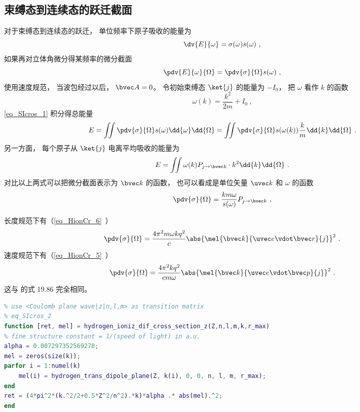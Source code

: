 \subsection{束缚态到连续态的跃迁截面}
对于束缚态到连续态的跃迁， 单位频率下原子吸收的能量为
\begin{equation}
\dv{E}{\omega} = \sigma(\omega) s(\omega)~,
\end{equation}
如果再对立体角微分得某频率的微分截面 %
\begin{equation}\label{eq_SIcros_1}
\pdv{E}{\omega}{\Omega} = \pdv{\sigma}{\Omega} s(\omega)~,
\end{equation}
使用速度规范， 当波包经过以后， $\bvec A = 0$。 令初始束缚态 $\ket{j}$ 的能量为 $-I_0$， 把 $\omega$ 看作 $k$ 的函数
\begin{equation}
\omega(k) = \frac{k^2}{2m} + I_0~,
\end{equation}
\autoref{eq_SIcros_1} 积分得总能量
\begin{equation}
E = \iint \pdv{\sigma}{\Omega} s(\omega) \dd{\omega}\dd{\Omega} = \iint \pdv{\sigma}{\Omega} s(\omega(k)) \frac{k}{m}\dd{k}\dd{\Omega}~.
\end{equation}
另一方面， 每个原子从 $\ket{j}$ 电离平均吸收的能量为
\begin{equation}
E = \iint \omega(k) P_{j\to {\bvec k}} \cdot k^2 \dd{k}\dd{\Omega}~.
\end{equation}
对比以上两式可以把微分截面表示为 $\bvec k$ 的函数， 也可以看成是单位矢量 $\uvec k$ 和 $\omega$ 的函数
\begin{equation}
\pdv{\sigma}{\Omega} = \frac{km \omega}{s(\omega)} P_{j\to \bvec k}~,
\end{equation}

长度规范下有（\autoref{eq_HionCr_6}~）
\begin{equation}\label{eq_SIcros_2}
\pdv{\sigma}{\Omega} = \frac{4\pi^2 m\omega k q^2}{c} \abs{\mel{\bvec k}{\uvec e \vdot\bvec r}{j}}^2~.
\end{equation}
速度规范下有（\autoref{eq_HionCr_5}~）
\begin{equation}\label{eq_SIcros_8}
\pdv{\sigma}{\Omega} = \frac{4\pi^2 k q^2}{c m \omega} \abs{\mel{\bvec k}{\uvec e \vdot \bvec p}{j}}^2~.
\end{equation}
这与 \cite{Merzbacher} 的式 19.86 完全相同。

\begin{lstlisting}[language=matlab, caption=hydrogen\_ioniz\_dif\_cross\_section\_z.m]
% hydrogen single ionization differential cross section
% use <Coulomb plane wave|z|n,l,m> as transition matrix
% eq_SIcros_2
function [ret, mel] = hydrogen_ioniz_dif_cross_section_z(Z,n,l,m,k,r_max)
% fine structure constant = 1/(speed of light) in a.u.
alpha = 0.007297352569278;
mel = zeros(size(k));
parfor i = 1:numel(k)
    mel(i) = hydrogen_trans_dipole_plane(Z, k(i), 0, 0, n, l, m, r_max);
end
ret = (4*pi^2*(k.^2/2+0.5*Z^2/n^2).*k)*alpha .* abs(mel).^2;
end
\end{lstlisting}
